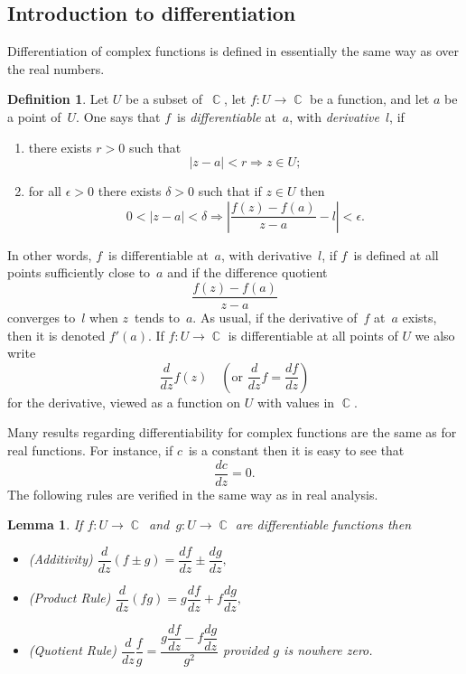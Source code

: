 \documentclass{amsproc}
\newtheorem{lemma}[theorem]{Lemma}
\theoremstyle{definition}
\newtheorem{definition}[theorem]{Definition}
\theoremstyle{remark}
\DeclareMathOperator{\C}{\mathbb{C}}
\numberwithin{equation}{section}
\begin{document}
\vfill
\pagebreak


\subsection{Introduction to differentiation} \label{CMS1}

Differentiation of complex functions is defined in essentially the same way as over the real numbers.

\begin{definition} \label{CMD1.1}
Let $ U $ be a subset of~$ \C $, let $ f: U \rightarrow \C $ be a function, and let $ a $ be a point of~$ U $.
One says that $ f $~is \emph{differentiable} at~$ a $, with \emph{derivative}~$ l $, if
\begin{enumerate}
\item[(1)] there exists $ r > 0 $ such that
$$
|z - a| < r \Rightarrow z \in U;
$$
\item[(2)] for all $ \epsilon > 0 $ there exists $ \delta > 0 $ such that if $ z \in U $ then
$$
0 < |z - a| < \delta \Rightarrow \left|\dfrac{f(z) - f(a)}{z - a} - l\right| < \epsilon.
$$
\end{enumerate}
\end{definition}

In other words, $ f $~is differentiable at~$ a $, with derivative~$ l $, if $ f $~is defined at all points sufficiently close to~$ a $ and if the difference quotient
$$
\dfrac{f(z) - f(a)}{z - a}
$$
converges to~$ l $ when $ z $~tends to~$ a $. As usual, if the derivative of~$ f $ at~$ a $ exists, then it is denoted $ f'(a) $. If $ f: U \rightarrow \C $
is differentiable at all points of $ U $ we also write
$$
\dfrac{d}{dz}f(z) \quad (\text{or } \dfrac{d}{dz}f = \dfrac{df}{dz})
$$
for the derivative, viewed as a function on $ U $ with values in $ \C $.

Many results regarding differentiability for complex functions are the same as for real functions.
For instance, if $ c $~is a constant then it is easy to see that
$$
\dfrac{dc}{dz} = 0.
$$
The following rules are verified in the same way as in real analysis.

\begin{lemma}
If $ f: U \rightarrow \C $~and~$ g: U \rightarrow \C $ are differentiable functions then
\begin{itemize}
\item (Additivity) $ \dfrac{d}{dz}(f\pm g)=\dfrac{df}{dz}\pm\dfrac{dg}{dz}, $
\item (Product Rule) $ \dfrac{d}{dz}(fg)=g\dfrac{df}{dz}+f\dfrac{dg}{dz}, $
\item (Quotient Rule) $ \dfrac{d}{dz}\dfrac{f}{g}=\dfrac{g\dfrac{df}{dz}-f\dfrac{dg}{dz}}{g^2} $ provided $ g $ is nowhere zero.
\end{itemize}
\end{lemma}
\end{document}
